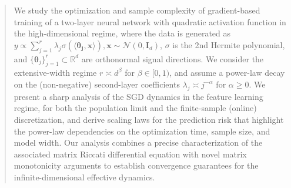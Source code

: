 \begin{abstract}

We study the optimization and sample complexity of gradient-based training of a two-layer neural network with quadratic activation function in the high-dimensional regime, where the data is generated as $y \propto \sum_{j=1}^{r}\lambda_j \sigma\left(\langle \boldsymbol{\theta_j}, \boldsymbol{x}\rangle\right), \boldsymbol{x} \sim \mathcal{N}(0,\boldsymbol{I}_d)$, $\sigma$ is the 2nd Hermite polynomial, and $\lbrace\boldsymbol{\theta}_j \rbrace_{j=1}^{r} \subset \mathbb{R}^d$ are orthonormal signal directions. We consider the extensive-width regime $r \asymp d^\beta$ for $\beta \in [0, 1)$, and assume a power-law decay on the (non-negative) second-layer coefficients $\lambda_j\asymp j^{-\alpha}$ for $\alpha \geq 0$. 
We present a sharp analysis of the SGD dynamics in the feature learning regime, for both the population limit and the finite-sample (online) discretization, and derive scaling laws for the prediction risk that highlight the power-law dependencies on the optimization time, sample size, and model width. Our analysis combines a precise characterization of the associated matrix Riccati differential equation with novel matrix monotonicity arguments to establish convergence guarantees for the infinite-dimensional effective dynamics. 

\end{abstract}